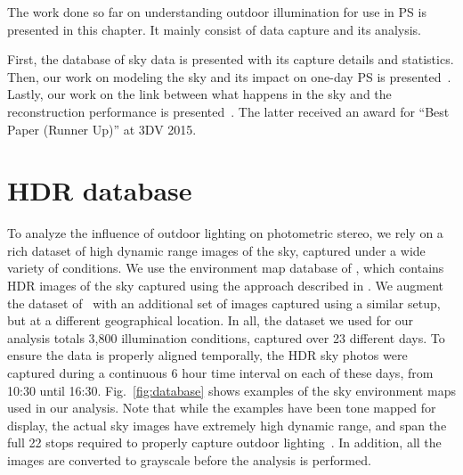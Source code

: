 \documentclass{report}
\begin{document}
The work done so far on understanding outdoor illumination for use in PS is presented in this chapter. It mainly consist of data capture and its analysis.

First, the database of sky data is presented with its capture details and statistics. Then, our work on modeling the sky and its impact on one-day PS is presented~\cite{holdgeoffroy-iccp-15}. Lastly, our work on the link between what happens in the sky and the reconstruction performance is presented~\cite{holdgeoffroy-3dv-15}. The latter received an award for ``Best Paper (Runner Up)'' at 3DV 2015.

\section{HDR database}
\label{sec:hdrdb}


To analyze the influence of outdoor lighting on photometric stereo, we rely on a rich dataset of high dynamic range images of the sky, captured under a wide variety of conditions. We use the environment map database of \cite{lalonde-3dv-14}, which contains HDR images of the sky captured using the approach described in \cite{stumpfel-afrigraph-04}. We augment the dataset of~\cite{lalonde-3dv-14} with an additional set of images captured using a similar setup, but at a different geographical location. In all, the dataset we used for our analysis totals 3,800 illumination conditions, captured over 23 different days. To ensure the data is properly aligned temporally, the HDR sky photos were captured during a continuous 6 hour time interval on each of these days, from 10:30 until 16:30. Fig.~\ref{fig:database} shows examples of the sky environment maps used in our analysis. Note that while the examples have been tone mapped for display, the actual sky images have extremely high dynamic range, and span the full 22 stops required to properly capture outdoor lighting~\cite{stumpfel-afrigraph-04}. In addition, all the images are converted to grayscale before the analysis is performed.
\end{document}
